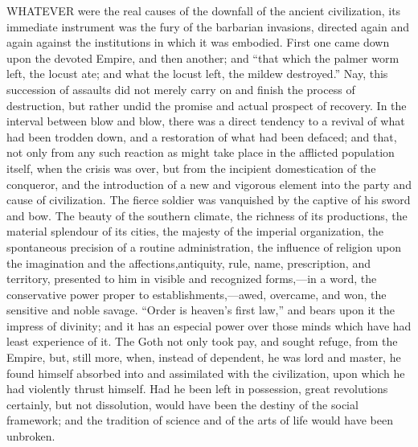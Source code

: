 WHATEVER were the real causes of the
downfall of the ancient civilization, its immediate instrument was the
fury of the barbarian invasions, directed again and again against the
institutions in which it was embodied. First one came down upon the
devoted Empire, and then another; and ``that which the palmer worm
left, the locust ate; and what the locust left, the mildew
destroyed.'' Nay, this succession of assaults did not merely carry
on and finish the process of destruction, but rather undid the promise
and actual prospect of recovery. In the interval between blow and
blow, there was a direct tendency to a revival of what had been
trodden down, and a restoration of what had been defaced; and that,
not only from any such reaction as might take place in the afflicted
population itself, when the crisis was over, but from the incipient
domestication of the conqueror, and the introduction of a new and
vigorous element into the party and cause of civilization. The fierce
soldier was vanquished by the captive of his sword and bow. The beauty
of the southern climate, the richness of its productions, the material
splendour of its cities, the majesty of the imperial organization, the
spontaneous precision of a routine administration, the influence of
religion upon the imagination and the affections,antiquity,
rule, name, prescription, and territory, presented to him in visible
and recognized forms,—in a word, the conservative power proper to
establishments,—awed, overcame, and won, the sensitive and noble
savage. ``Order is heaven's first law,'' and bears upon it the
impress of divinity; and it has an especial power over those minds
which have had least experience of it. The Goth not only took pay, and
sought refuge, from the Empire, but, still more, when, instead of
dependent, he was lord and master, he found himself absorbed into and
assimilated with the civilization, upon which he had violently thrust
himself. Had he been left in possession, great revolutions certainly,
but not dissolution, would have been the destiny of the social
framework; and the tradition of science and of the arts of life would
have been unbroken.

